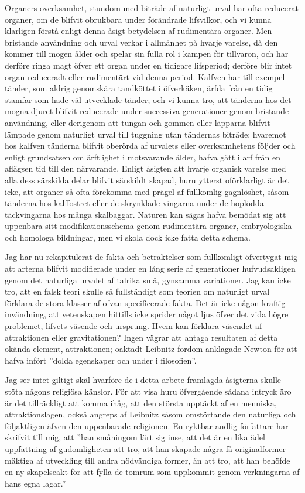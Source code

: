 Organers overksamhet, stundom med biträde af naturligt urval har ofta reducerat organer, om de blifvit obrukbara under förändrade lifsvilkor, och vi kunna klarligen förstå enligt denna åsigt betydelsen af rudimentära organer. Men bristande användning och urval verkar i allmänhet på hvarje varelse, då den kommer till mogen ålder och spelar sin fulla rol i kampen för tillvaron, och har derföre ringa magt öfver ett organ under en tidigare lifsperiod; derföre blir intet organ reduceradt eller rudimentärt vid denna period. Kalfven har till exempel tänder, som aldrig genomskära tandköttet i öfverkäken, ärfda från en tidig stamfar som hade väl utvecklade tänder; och vi kunna tro, att tänderna hos det mogna djuret blifvit reducerade under successiva generationer genom bristande användning, eller derigenom att tungan och gommen eller läpparna blifvit lämpade genom naturligt urval till tuggning utan tändernas biträde; hvaremot hos kalfven tänderna blifvit oberörda af urvalets eller overksamhetens följder och enligt grundsatsen om ärftlighet i motsvarande ålder, hafva gått i arf från en aflägsen tid till den närvarande. Enligt åsigten att hvarje organisk varelse med alla dess särskilda delar blifvit särskildt skapad, huru ytterst oförklarligt är det icke, att organer så ofta förekomma med prägel af fullkomlig gagnlöshet, såsom tänderna hos kalffostret eller de skrynklade vingarna under de hoplödda täckvingarna hos många skalbaggar. Naturen kan sägas hafva bemödat sig att uppenbara sitt modifikationsschema genom rudimentära organer, embryologiska och homologa bildningar, men vi skola dock icke fatta detta schema.

Jag har nu rekapitulerat de fakta och betraktelser som fullkomligt öfvertygat mig att arterna blifvit modifierade under en lång serie af generationer hufvudsakligen genom det naturliga urvalet af talrika små, gynsamma variationer. Jag kan icke tro, att en falsk teori skulle så fullständigt som teorien om naturligt urval förklara de stora klasser af ofvan specificerade fakta. Det är icke någon kraftig invändning, att vetenskapen hittills icke sprider något ljus öfver det vida högre problemet, lifvets väsende och ursprung. Hvem kan förklara väsendet af attraktionen eller gravitationen? Ingen vägrar att antaga resultaten af detta okända element, attraktionen; oaktadt Leibnitz fordom anklagade Newton för att hafva infört ”dolda egenskaper och under i filosofien”.

Jag ser intet giltigt skäl hvarföre de i detta arbete framlagda åsigterna skulle stöta någons religiösa känslor. För att visa huru öfvergående sådana intryck äro är det tillräckligt att komma ihåg, att den största upptäckt af en menniska, attraktionslagen, också angreps af Leibnitz såsom omstörtande den naturliga och följaktligen äfven den uppenbarade religionen. En ryktbar andlig författare har skrifvit till mig, att ”han småningom lärt sig inse, att det är en lika ädel uppfattning af gudomligheten att tro, att han skapade några få originalformer mäktiga af utveckling till andra nödvändiga former, än att tro, att han behöfde en ny skapelseakt för att fylla de tomrum som uppkommit genom verkningarna af hans egna lagar.”

